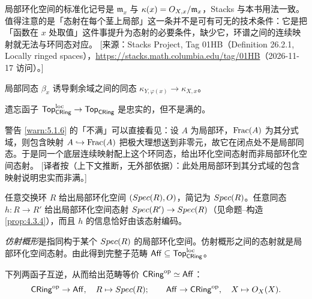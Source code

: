 \begin{yizhu}
局部环化空间的标准化记号是 $\mathfrak m_x$ 与 $\kappa(x)=O_{X,x}/\mathfrak m_x$，Stacks 与本书用法一致。值得注意的是「态射在每个茎上局部」这一条并不是可有可无的技术条件：它是把「函数在 $x$ 处取值」这件事提升为态射的必要条件，缺少它，环谱之间的连续映射就无法与环同态对应。
[来源：Stacks Project, Tag 01HB（Definition 26.2.1, Locally ringed spaces），\url{https://stacks.math.columbia.edu/tag/01HB}（2026-11-17 访问）。]
\end{yizhu}

\begin{construction}\label{con:5.1.5}
局部同态 $\beta_x$ 诱导剩余域之间的同态 $\kappa_{Y,\varphi(x)}\to\kappa_{X,x}$。
\end{construction}

\begin{warning}\label{warn:5.1.6}
遗忘函子 $\mathsf{Top}^{\mathrm{loc}}_{\mathsf{CRing}}\to\mathsf{Top}_{\mathsf{CRing}}$ 是忠实的，但不是满的。
\end{warning}

\begin{yizhu}
警告 \ref{warn:5.1.6} 的「不满」可以直接看见：设 $A$ 为局部环，$\operatorname{Frac}(A)$ 为其分式域，则包含映射 $A\hookrightarrow\operatorname{Frac}(A)$ 把极大理想送到非零元，故它在闭点处不是局部同态。于是同一个底层连续映射配上这个环同态，给出环化空间态射而非局部环化空间态射。
[译者按（上下文推断，无外部依据）：此处用局部环到其分式域的包含映射说明忠实而非满。]
\end{yizhu}

\begin{example}\label{ex:5.1.7}
任意交换环 $R$ 给出局部环化空间 $(Spec(R),O)$，简记为 $Spec(R)$。任意同态 $h:R\to R'$ 给出局部环化空间态射 $Spec(R')\to Spec(R)$（见命题--构造 \ref{prop:4.3.4}），而且 $h$ 的信息恰好由该态射编码。
\end{example}

\begin{definition}\label{def:5.1.8}
\emph{仿射概形}是指同构于某个 $Spec(R)$ 的局部环化空间。仿射概形之间的态射就是局部环化空间态射。由此得到完整子范畴 $\mathsf{Aff}\subseteq\mathsf{Top}^{\mathrm{loc}}_{\mathsf{CRing}}$。
\end{definition}

\begin{propcon}\label{prop:5.1.9}
下列两函子互逆，从而给出范畴等价 $\mathsf{CRing}^{\mathrm{op}}\simeq\mathsf{Aff}$：
\[
\mathsf{CRing}^{\mathrm{op}}\to\mathsf{Aff},\quad R\mapsto Spec(R);
\qquad
\mathsf{Aff}\to\mathsf{CRing}^{\mathrm{op}},\quad X\mapsto O_X(X).
\]
\end{propcon}

